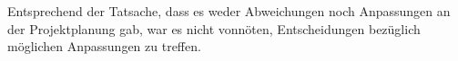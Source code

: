 Entsprechend der Tatsache, dass es weder Abweichungen noch Anpassungen an der Projektplanung gab, war es nicht vonnöten, Entscheidungen bezüglich möglichen Anpassungen zu treffen.